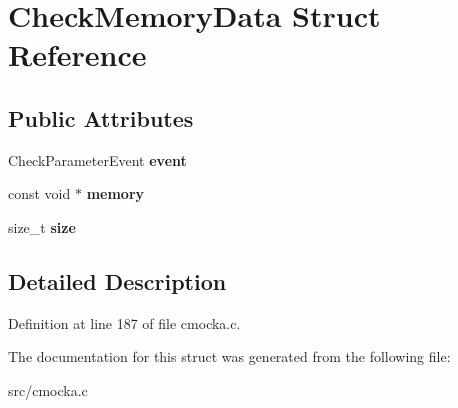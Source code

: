 \hypertarget{structCheckMemoryData}{}\section{Check\+Memory\+Data Struct Reference}
\label{structCheckMemoryData}
\subsection*{Public Attributes}
\begin{DoxyCompactItemize}
\item 
\mbox{\label{structCheckMemoryData_afa102f599993f28924b9f73cf9b45990}} 
Check\+Parameter\+Event {\bfseries event}
\item 
\mbox{\label{structCheckMemoryData_aac7288cc682bfa7917c6258c56aeb723}} 
const void $\ast$ {\bfseries memory}
\item 
\mbox{\label{structCheckMemoryData_a0015b301a15e7b148e95aa1d6f51cb11}} 
size\+\_\+t {\bfseries size}
\end{DoxyCompactItemize}


\subsection{Detailed Description}


Definition at line 187 of file cmocka.\+c.



The documentation for this struct was generated from the following file\+:\begin{DoxyCompactItemize}
\item 
src/cmocka.\+c\end{DoxyCompactItemize}
